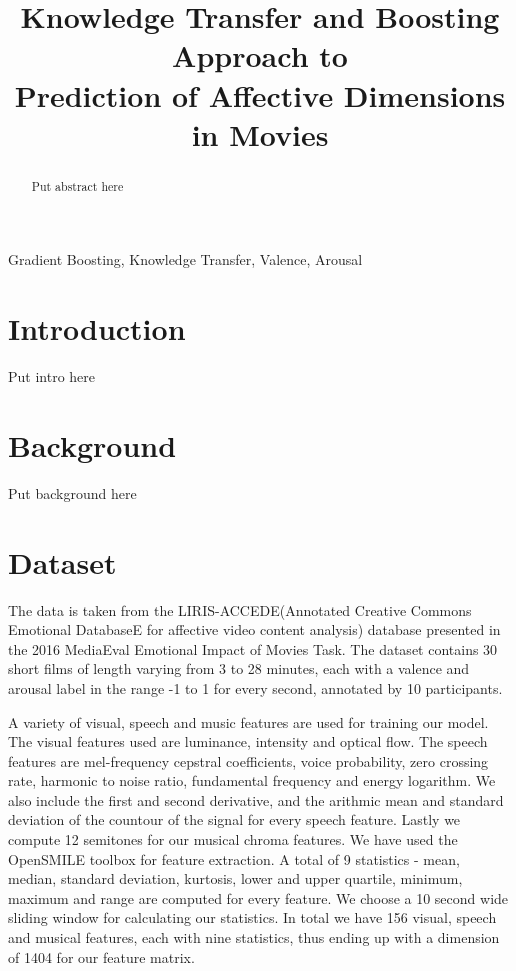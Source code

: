 \documentclass{article}
\title{Knowledge Transfer and Boosting Approach to \\Prediction of Affective Dimensions in Movies}
\begin{document}
\ninept
%
\maketitle
%
\begin{abstract}
   Put abstract here 
 
\end{abstract}
%
\begin{keywords}
Gradient Boosting, Knowledge Transfer, Valence, Arousal
\end{keywords}
%
\section{Introduction}
\label{sec:intro}
Put intro here

\section{Background}
Put background here

\section{Dataset}
The data is taken from the LIRIS-ACCEDE(Annotated Creative Commons Emotional DatabaseE for affective video content analysis) database \cite{baveye2015liris} presented in the 2016 MediaEval Emotional Impact of Movies Task. The dataset contains 30 short films of length varying from 3 to 28 minutes, each with a valence and arousal label in the range -1 to 1 for every second, annotated by 10 participants.

\indent  A variety of visual, speech and music features are used for training our model. The visual features used are luminance, intensity and optical flow. The speech features are mel-frequency cepstral coefficients, voice probability, zero crossing rate, harmonic to noise ratio, fundamental frequency and energy logarithm. We also include the first and second derivative, and the arithmic mean and standard deviation of the countour of the signal for every speech feature. Lastly we compute 12 semitones for our musical chroma features. We have used the OpenSMILE toolbox for feature extraction. A total of 9 statistics - mean, median, standard deviation, kurtosis, lower and upper quartile, minimum, maximum and range are computed for every feature. We choose a 10 second wide sliding window for calculating our statistics. In total we have 156 visual, speech and musical features, each with nine statistics, thus ending up with a dimension of 1404 for our feature matrix.
\end{document}
